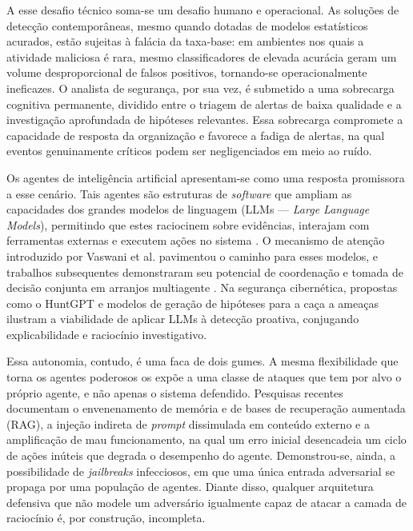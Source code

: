A esse desafio técnico soma-se um desafio humano e operacional. As soluções de
detecção contemporâneas, mesmo quando dotadas de modelos estatísticos acurados,
estão sujeitas à falácia da taxa-base: em ambientes nos quais a atividade
maliciosa é rara, mesmo classificadores de elevada acurácia geram um volume
desproporcional de falsos positivos, tornando-se operacionalmente ineficazes. O
analista de segurança, por sua vez, é submetido a uma sobrecarga cognitiva
permanente, dividido entre o triagem de alertas de baixa qualidade e a
investigação aprofundada de hipóteses relevantes. Essa sobrecarga compromete a
capacidade de resposta da organização e favorece a fadiga de alertas, na qual
eventos genuinamente críticos podem ser negligenciados em meio ao ruído.

Os agentes de inteligência artificial apresentam-se como uma resposta promissora
a esse cenário. Tais agentes são estruturas de \emph{software} que ampliam as
capacidades dos grandes modelos de linguagem (LLMs — \emph{Large Language
Models}), permitindo que estes raciocinem sobre evidências, interajam com
ferramentas externas e executem ações no sistema \cite{academia20}. O mecanismo
de atenção introduzido por Vaswani et al. \cite{vaswani2017attention} pavimentou
o caminho para esses modelos, e trabalhos subsequentes demonstraram seu potencial
de coordenação e tomada de decisão conjunta em arranjos multiagente
\cite{agashe2023llmcoordination}. Na segurança cibernética, propostas como o
HuntGPT \cite{ali2023huntgptintegratingmachinelearningbased} e modelos de geração
de hipóteses para a caça a ameaças \cite{10713082} ilustram a viabilidade de
aplicar LLMs à detecção proativa, conjugando explicabilidade e raciocínio
investigativo.

Essa autonomia, contudo, é uma faca de dois gumes. A mesma flexibilidade que
torna os agentes poderosos os expõe a uma classe de ataques que tem por alvo o
próprio agente, e não apenas o sistema defendido. Pesquisas recentes documentam o
envenenamento de memória e de bases de recuperação aumentada (RAG), a injeção
indireta de \emph{prompt} dissimulada em conteúdo externo e a amplificação de mau
funcionamento, na qual um erro inicial desencadeia um ciclo de ações inúteis que
degrada o desempenho do agente. Demonstrou-se, ainda, a possibilidade de
\emph{jailbreaks} infecciosos, em que uma única entrada adversarial se propaga
por uma população de agentes. Diante disso, qualquer arquitetura defensiva que
não modele um adversário igualmente capaz de atacar a camada de raciocínio é,
por construção, incompleta.

